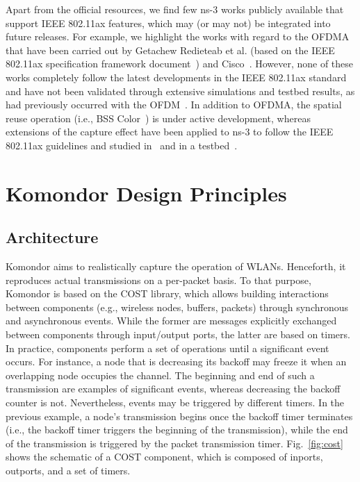 \documentclass{article}
\begin{document}
	Apart from the official resources, we find few ns-3 works publicly available that support IEEE 802.11ax features, which may (or may not) be integrated into future releases. For example, we highlight the works with regard to the OFDMA that have been carried out by Getachew Redieteab et al. (based on the IEEE 802.11ax specification framework document~\cite{stacey2016specification}) and Cisco~\cite{cisco2017simulator}. However, none of these works completely follow the latest developments in the IEEE 802.11ax standard and have not been validated through extensive simulations and testbed results, as had previously occurred with the OFDM~\cite{pei2010validation}. In addition to OFDMA, the spatial reuse operation (i.e., BSS Color~\cite{7794832_color}) is under active development, whereas extensions of the capture effect have been applied to ns-3 to follow the IEEE 802.11ax guidelines and studied in~\cite{selinis2017exploiting} and in a testbed~\cite{8433688_KhorovCE}.
	
	\section{Komondor Design Principles}
	\label{section:system_model}
	
	\subsection{Architecture}
	\label{subsection:architecture}
	Komondor aims to realistically capture the operation of WLANs. Henceforth, it reproduces actual transmissions on a per-packet basis. To that purpose, Komondor is based on the COST library, which allows building interactions between components (e.g., wireless nodes, buffers, packets) through synchronous and asynchronous events. While the former are messages explicitly exchanged between components through input/output ports, the latter are based on timers.
	In practice, components perform a set of operations until a significant event occurs. For instance, a node that is decreasing its backoff may freeze it when an overlapping node occupies the channel. The beginning and end of such a transmission are examples of significant events, whereas decreasing the backoff counter is not. Nevertheless, events may be triggered by different timers. In the previous example, a node's transmission begins once the backoff timer terminates (i.e., the backoff timer triggers the beginning of the transmission), while the end of the transmission is triggered by the packet transmission timer. Fig.~\ref{fig:cost} shows the schematic of a COST component, which is composed of inports, outports, and a set of timers. 
	
\end{document}
